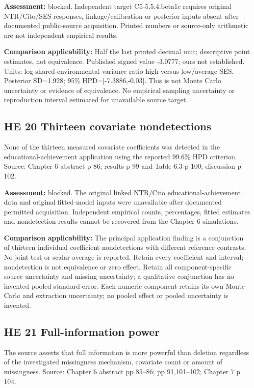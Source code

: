 \documentclass[11pt]{article}
\begin{document}
\textbf{Assessment:} blocked. Independent target C5-5.5.4.beta1c requires original NTR/Cito/SES responses, linkage/calibration or posterior inputs absent after documented public-source acquisition. Printed numbers or source-only arithmetic are not independent empirical results.

\textbf{Comparison applicability:} Half the last printed decimal unit; descriptive point estimates, not equivalence. Published signed value -3.0777; ours not established. Units: log shared-environmental-variance ratio high versus low/average SES. Posterior SD=1.928; 95\% HPD=[-7.3886,-0.03]. This is not Monte Carlo uncertainty or evidence of equivalence. No empirical sampling uncertainty or reproduction interval estimated for unavailable source target.
\subsection{HE 20 Thirteen covariate nondetections}\label{head:HE20}
None of the thirteen measured covariate coefficients was detected in the educational-achievement application using the reported 99.6\% HPD criterion. Source: Chapter 6 abstract p 86; results p 99 and Table 6.3 p 100; discussion p 102.

\textbf{Assessment:} blocked. The original linked NTR/Cito educational-achievement data and original fitted-model inputs were unavailable after documented permitted acquisition. Independent empirical counts, percentages, fitted estimates and nondetection results cannot be recovered from the Chapter 6 simulations.

\textbf{Comparison applicability:} The principal application finding is a conjunction of thirteen individual coefficient nondetections with different reference contrasts. No joint test or scalar average is reported. Retain every coefficient and interval; nondetection is not equivalence or zero effect. Retain all component-specific source uncertainty and missing uncertainty; a qualitative conjunction has no invented pooled standard error. Each numeric component retains its own Monte Carlo and extraction uncertainty; no pooled effect or pooled uncertainty is invented.
\subsection{HE 21 Full-information power}\label{head:HE21}
The source asserts that full information is more powerful than deletion regardless of the investigated missingness mechanism, covariate count or amount of missingness. Source: Chapter 6 abstract pp 85--86; pp 91,101--102; Chapter 7 p 104.
\end{document}
